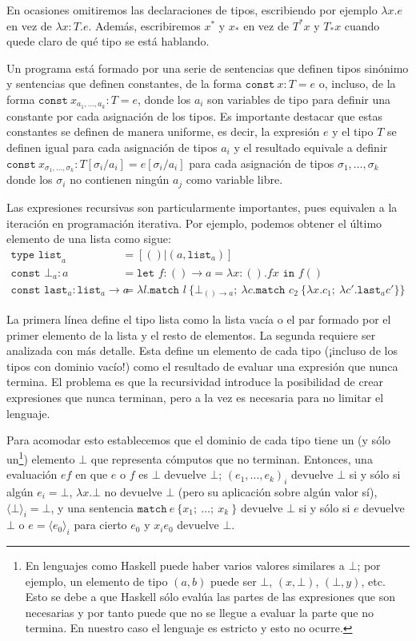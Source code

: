 En ocasiones omitiremos las declaraciones de tipos, escribiendo por ejemplo
$\lambda x.e$ en vez de $\lambda x:T.e$. Además, escribiremos $x^*$ y $x_*$ en
vez de $T^*x$ y $T_*x$ cuando quede claro de qué tipo se está hablando.

Un programa está formado por una serie de sentencias que definen tipos sinónimo
y sentencias que definen constantes, de la forma $\mathtt{const\ }x:T=e$ o,
incluso, de la forma $\mathtt{const\ }x_{a_1,\dots,a_k}:T=e$, donde los $a_i$
son variables de tipo para definir una constante por cada asignación de los
tipos. Es importante destacar que estas constantes se definen de manera
uniforme, es decir, la expresión $e$ y el tipo $T$ se definen igual para cada
asignación de tipos $a_i$ y el resultado equivale a definir
$\mathtt{const\ }x_{\sigma_1,\dots,\sigma_k}:T[\sigma_i/a_i]=e[\sigma_i/a_i]$
para cada asignación de tipos $\sigma_1,\dots,\sigma_k$ donde los $\sigma_i$ no
contienen ningún $a_j$ como variable libre.

Las expresiones recursivas son particularmente importantes, pues equivalen a la
iteración en programación iterativa. Por ejemplo, podemos obtener el último
elemento de una lista como sigue:
\begin{align*}
  \texttt{type\ list}_a & = [() | (a, \texttt{list}_a)]\\
  \texttt{const\ }\bot_a : a & = \texttt{let\ }f:()\to a=\lambda x:().fx\texttt{\ in\ }f()\\
  \texttt{const last}_a : \texttt{list}_a \to a & = \lambda l.\texttt{match }l\ \{
    \bot_{()\to a};\
    \lambda c.\texttt{match }c_2\ \{\lambda x.c_1;\ \lambda c'.\texttt{last}_a c'\}
  \}
\end{align*}

La primera línea define el tipo lista como la lista vacía o el par formado por
el primer elemento de la lista y el resto de elementos. La segunda requiere ser
analizada con más detalle. Esta define un elemento de cada tipo (¡incluso de los
tipos con dominio vacío!) como el resultado de evaluar una expresión que nunca
termina. El problema es que la recursividad introduce la posibilidad de crear
expresiones que nunca terminan, pero a la vez es necesaria para no limitar el
lenguaje.

Para acomodar esto establecemos que el dominio de cada tipo tiene un (y sólo
un\footnote{En lenguajes como Haskell puede haber varios valores similares a
  $\bot$; por ejemplo, un elemento de tipo $(a,b)$ puede ser $\bot$, $(x,\bot)$,
  $(\bot,y)$, etc. Esto se debe a que Haskell sólo evalúa las partes de las
  expresiones que son necesarias y por tanto puede que no se llegue a evaluar la
  parte que no termina. En nuestro caso el lenguaje es estricto y esto no
  ocurre.}) elemento $\bot$ que representa cómputos que no terminan. Entonces,
una evaluación $ef$ en que $e$ o $f$ es $\bot$ devuelve $\bot$;
$(e_1,\dots,e_k)_i$ devuelve $\bot$ si y sólo si algún $e_i=\bot$,
$\lambda x.\bot$ no devuelve $\bot$ (pero su aplicación sobre algún valor sí),
$\langle\bot\rangle_i=\bot$, y una sentencia
$\mathtt{match\ }e\mathtt{\ \{}x_1\mathtt{;\ }\dots\mathtt{;\ }x_k\mathtt{\ \}}$
devuelve $\bot$ si y sólo si $e$ devuelve $\bot$ o $e=\langle e_0\rangle_i$ para
cierto $e_0$ y $x_ie_0$ devuelve $\bot$.

